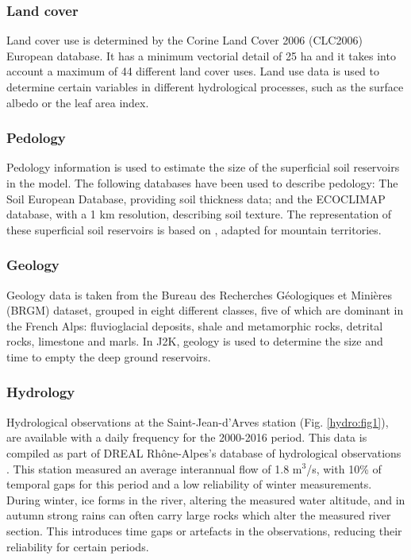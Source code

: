 \subsubsection{Land cover}

Land cover use is determined by the Corine Land Cover 2006 (CLC2006) European database. It has a minimum vectorial detail of 25 ha and it takes into account a maximum of 44 different land cover uses. Land use data is used to determine certain variables in different hydrological processes, such as the surface albedo or the leaf area index. 

\subsubsection{Pedology}

Pedology information is used to estimate the size of the superficial soil reservoirs in the model. The following databases have been used to describe pedology: The Soil European Database, providing soil thickness data; and the ECOCLIMAP database, with a 1 km resolution, describing soil texture. The representation of these superficial soil reservoirs is based on \citet{sauquet_risk_2014}, adapted for mountain territories. 

\subsubsection{Geology}

Geology data is taken from the Bureau des Recherches Géologiques et Minières (BRGM) dataset, grouped in eight different classes, five of which are dominant in the French Alps: fluvioglacial deposits, shale and metamorphic rocks, detrital rocks, limestone and marls. In J2K, geology is used to determine the size and time to empty the deep ground reservoirs. 

\subsubsection{Hydrology}

Hydrological observations at the Saint-Jean-d'Arves station (Fig. \ref{hydro:fig1}), are available with a daily frequency for the 2000-2016 period. This data is compiled as part of DREAL Rhône-Alpes's database of hydrological observations \citep{brigode_summary_2020}. This station measured an average interannual flow of 1.8 m$^{3}$/s, with 10\% of temporal gaps for this period and a low reliability of winter measurements. During winter, ice forms in the river, altering the measured water altitude, and in autumn strong rains can often carry large rocks which alter the measured river section. This introduces time gaps or artefacts in the observations, reducing their reliability for certain periods. 

